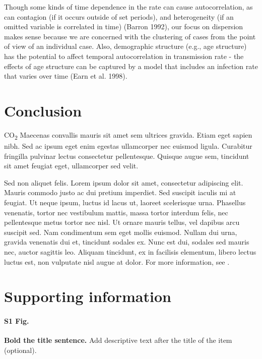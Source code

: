\documentclass[10pt,letterpaper]{article}
\begin{document}
Though some kinds of time dependence in the rate can cause autocorrelation, as can contagion (if it occurs outside of set periods), and heterogeneity (if an omitted variable is correlated in time) (Barron 1992), our focus on dispersion makes sense because we are concerned with the clustering of cases from the point of view of an individual case. Also, demographic structure (e.g., age structure) has the potential to affect temporal autocorrelation in transmission rate - the effects of age structure can be captured by a model that includes an infection rate that varies over time (Earn et al. 1998). 

\section*{Conclusion}

CO\textsubscript{2} Maecenas convallis mauris sit amet sem ultrices gravida. Etiam eget sapien nibh. Sed ac ipsum eget enim egestas ullamcorper nec euismod ligula. Curabitur fringilla pulvinar lectus consectetur pellentesque. Quisque augue sem, tincidunt sit amet feugiat eget, ullamcorper sed velit. 

Sed non aliquet felis. Lorem ipsum dolor sit amet, consectetur adipiscing elit. Mauris commodo justo ac dui pretium imperdiet. Sed suscipit iaculis mi at feugiat. Ut neque ipsum, luctus id lacus ut, laoreet scelerisque urna. Phasellus venenatis, tortor nec vestibulum mattis, massa tortor interdum felis, nec pellentesque metus tortor nec nisl. Ut ornare mauris tellus, vel dapibus arcu suscipit sed. Nam condimentum sem eget mollis euismod. Nullam dui urna, gravida venenatis dui et, tincidunt sodales ex. Nunc est dui, sodales sed mauris nec, auctor sagittis leo. Aliquam tincidunt, ex in facilisis elementum, libero lectus luctus est, non vulputate nisl augue at dolor. For more information, see .

\section*{Supporting information}

\paragraph*{S1 Fig.}
\label{S1_Fig}
{\bf Bold the title sentence.} Add descriptive text after the title of the item (optional).
\end{document}
